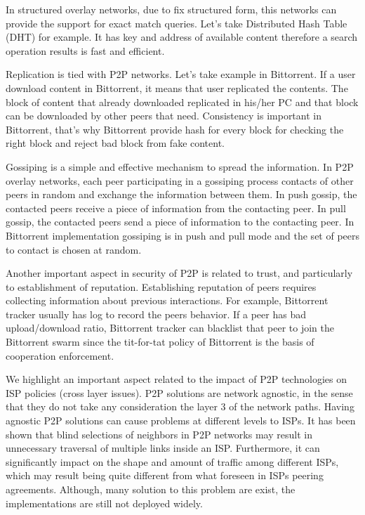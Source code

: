 In structured overlay networks, due to fix structured form, this networks can provide the support for exact match queries.  
Let's take Distributed Hash Table (DHT) for example. 
It has key and address of available content therefore a search operation results is fast and efficient.

Replication is tied with P2P networks.  
Let's take example in Bittorrent.  
If a user download content in Bittorrent,  it means that user replicated the contents.  
The block of content that already downloaded replicated in his/her PC and that block can be downloaded by other peers that need.
Consistency is important in Bittorrent, that's why Bittorrent provide hash for every block for checking the right block and reject bad block from fake content.

Gossiping is a simple and effective mechanism to spread the information. 
In P2P overlay networks, each peer participating in a gossiping process contacts of other peers in random and exchange the information between them.
In push gossip, the contacted peers receive a piece of information from the contacting peer. 
In pull gossip, the contacted peers send a piece of information to the contacting peer. 
In Bittorrent implementation gossiping is in push and pull mode and the set of peers to contact is chosen at random.

Another important aspect in security of P2P is related to trust, and particularly to establishment of reputation. 
Establishing reputation of peers requires collecting information about previous interactions. 
For example, Bittorrent tracker usually has log to record the peers behavior. 
If a peer has bad upload/download ratio, Bittorrent tracker can blacklist that peer to join the Bittorrent swarm since the tit-for-tat policy of Bittorrent is the basis of cooperation enforcement.

We highlight an important aspect related to the impact of P2P technologies on ISP policies (cross layer issues). 
P2P solutions are network agnostic, in the sense that they do not take any consideration the layer 3 of the network paths. 
Having agnostic P2P solutions can cause problems at different levels to ISPs. 
It has been shown that blind selections of neighbors in P2P networks may result in unnecessary traversal of multiple links inside an ISP. 
Furthermore, it can significantly impact on the shape and amount of traffic among different ISPs, which may result being quite different from what foreseen in ISPs peering agreements.
Although, many solution to this problem are exist, the implementations are still not deployed widely.  

